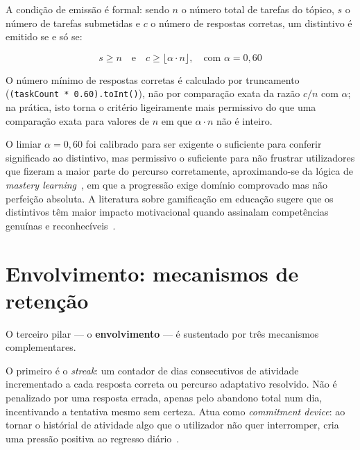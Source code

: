 A condi\c{c}\~ao de emiss\~ao \'e formal: sendo $n$ o n\'umero total de
tarefas do t\'opico, $s$ o n\'umero de tarefas submetidas e $c$ o n\'umero
de respostas corretas, um distintivo \'e emitido se e s\'o se:

\begin{equation}
	s \geq n \quad \text{e} \quad c \geq \lfloor \alpha \cdot n \rfloor,\quad \text{com } \alpha = 0{,}60
	\label{eq:badge}
\end{equation}

\noindent O n\'umero m\'inimo de respostas corretas \'e calculado por
truncamento (\texttt{(taskCount * 0.60).toInt()}), n\~ao por compara\c{c}\~ao
exata da raz\~ao $c/n$ com $\alpha$; na pr\'atica, isto torna o crit\'erio
ligeiramente mais permissivo do que uma compara\c{c}\~ao exata para valores
de $n$ em que $\alpha \cdot n$ n\~ao \'e inteiro.

O limiar $\alpha = 0{,}60$ foi calibrado para ser exigente o suficiente para
conferir significado ao distintivo, mas permissivo o suficiente para n\~ao
frustrar utilizadores que fizeram a maior parte do percurso corretamente,
aproximando-se da l\'ogica de \emph{mastery learning}~\cite{bloom1968learning},
em que a progress\~ao exige dom\'inio comprovado mas n\~ao perfei\c{c}\~ao
absoluta. A literatura sobre gamifica\c{c}\~ao em educa\c{c}\~ao sugere que
os distintivos t\^em maior impacto motivacional quando assinalam
compet\^encias genu\'inas e reconhec\'iveis~\cite{ott2019gamification}.

\section{Envolvimento: mecanismos de reten\c{c}\~ao}
\label{sec:envolvimento}

O terceiro pilar --- o \textbf{envolvimento} --- \'e sustentado por tr\^es
mecanismos complementares.

O primeiro \'e o \emph{streak}: um contador de dias consecutivos de atividade
incrementado a cada resposta correta ou percurso adaptativo resolvido. N\~ao
\'e penalizado por uma resposta errada, apenas pelo abandono total num dia,
incentivando a tentativa mesmo sem certeza. Atua como \emph{commitment device}:
ao tornar o hist\'orial de atividade algo que o utilizador n\~ao quer
interromper, cria uma press\~ao positiva ao regresso di\'ario~\cite{ott2019gamification}.

